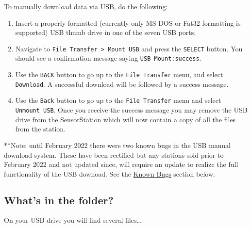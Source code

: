 \documentclass[
]{article}
\providecommand{\tightlist}{%
  \setlength{\itemsep}{0pt}\setlength{\parskip}{0pt}}
\begin{document}
To manually download data via USB, do the following:

\begin{enumerate}
\def\labelenumi{\arabic{enumi}.}
\tightlist
\item
  Insert a properly formatted (currently only MS DOS or Fat32 formatting
  is supported) USB thumb drive in one of the seven USB ports.
\item
  Navigate to \texttt{File\ Transfer\ \textgreater{}\ Mount\ USB} and
  press the \texttt{SELECT} button. You should see a confirmation
  message saying \texttt{USB\ Mount:success}.
\item
  Use the \texttt{BACK} button to go up to the \texttt{File\ Transfer}
  menu, and select \texttt{Download}. A successful download will be
  followed by a success message.
\item
  Use the \texttt{Back} button to go up to the \texttt{File\ Transfer}
  menu and select \texttt{Unmount\ USB}. Once you receive the success
  message you may remove the USB drive from the SensorStation which will
  now contain a copy of all the files from the station.
\end{enumerate}

**Note: until February 2022 there were two known bugs in the USB manual
download system. These have been rectified but any stations sold prior
to February 2022 and not updated since, will require an update to
realize the full functionality of the USB downoad. See the
\protect\hyperlink{known-bugs}{Known Bugs} section below.

\hypertarget{whats-in-the-folder}{%
\subsection{What's in the folder?}\label{whats-in-the-folder}}

On your USB drive you will find several files\ldots{}
\end{document}
